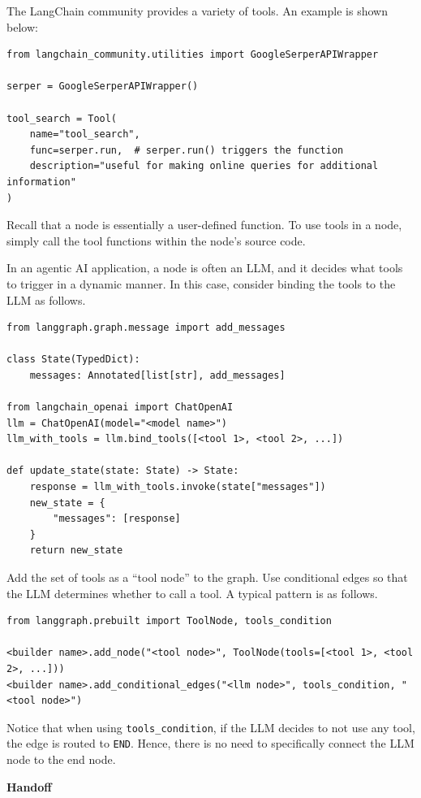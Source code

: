 The LangChain community provides a variety of tools. An example is shown below:
\begin{lstlisting}
from langchain_community.utilities import GoogleSerperAPIWrapper

serper = GoogleSerperAPIWrapper()

tool_search = Tool(
    name="tool_search",
    func=serper.run,  # serper.run() triggers the function
    description="useful for making online queries for additional information"
)
\end{lstlisting}

Recall that a node is essentially a user-defined function. To use tools in a node, simply call the tool functions within the node’s source code.

In an agentic AI application, a node is often an LLM, and it decides what tools to trigger in a dynamic manner. In this case, consider binding the tools to the LLM as follows.
\begin{lstlisting}
from langgraph.graph.message import add_messages

class State(TypedDict):
    messages: Annotated[list[str], add_messages]
    
from langchain_openai import ChatOpenAI
llm = ChatOpenAI(model="<model name>")
llm_with_tools = llm.bind_tools([<tool 1>, <tool 2>, ...])

def update_state(state: State) -> State:
    response = llm_with_tools.invoke(state["messages"])
    new_state = {
        "messages": [response]
    }
    return new_state
\end{lstlisting}

Add the set of tools as a ``tool node'' to the graph. Use conditional edges so that the LLM determines whether to call a tool. A typical pattern is as follows.
\begin{lstlisting}
from langgraph.prebuilt import ToolNode, tools_condition

<builder name>.add_node("<tool node>", ToolNode(tools=[<tool 1>, <tool 2>, ...]))
<builder name>.add_conditional_edges("<llm node>", tools_condition, "<tool node>")
\end{lstlisting}
Notice that when using \verb|tools_condition|, if the LLM decides to not use any tool, the edge is routed to \verb|END|. Hence, there is no need to specifically connect the LLM node to the end node.







\vspace{0.1in}
\noindent \textbf{Handoff}
\vspace{0.1in}













